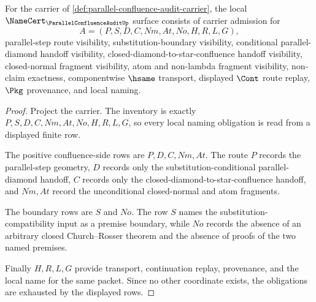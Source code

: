 \begin{theorem}
\label{thm:parallel-confluence-audit-namecert-obligations}
For the carrier of \autoref{def:parallel-confluence-audit-carrier}, the local $\NameCert_{\ParallelConfluenceAuditUp}$ surface consists of carrier admission for
$$
A=(P,S,D,C,Nm,At,No,H,R,L,G),
$$
parallel-step route visibility, substitution-boundary visibility, conditional parallel-diamond handoff visibility, closed-diamond-to-star-confluence handoff visibility, closed-normal fragment visibility, atom and non-lambda fragment visibility, non-claim exactness, componentwise $\hsame$ transport, displayed $\Cont$ route replay, $\Pkg$ provenance, and local naming.
\end{theorem}
\begin{proof}
Project the carrier. The inventory is exactly $P,S,D,C,Nm,At,No,H,R,L,G$, so every local naming obligation is read from a displayed finite row.

The positive confluence-side rows are $P,D,C,Nm,At$. The route $P$ records the parallel-step geometry, $D$ records only the substitution-conditional parallel-diamond handoff, $C$ records only the closed-diamond-to-star-confluence handoff, and $Nm,At$ record the unconditional closed-normal and atom fragments.

The boundary rows are $S$ and $No$. The row $S$ names the substitution-compatibility input as a premise boundary, while $No$ records the absence of an arbitrary closed Church--Rosser theorem and the absence of proofs of the two named premises.

Finally $H,R,L,G$ provide transport, continuation replay, provenance, and the local name for the same packet. Since no other coordinate exists, the obligations are exhausted by the displayed rows.
\end{proof}

